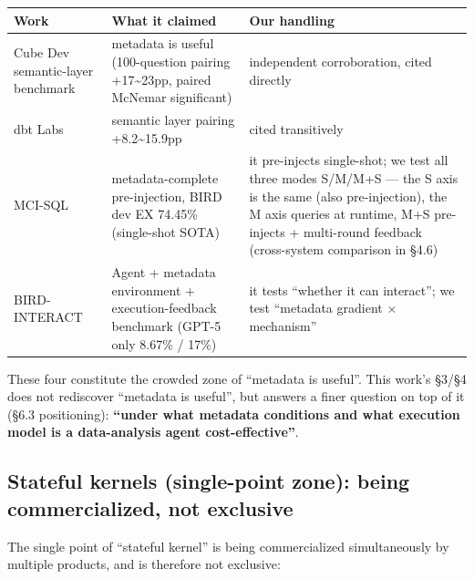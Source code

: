 \documentclass[11pt]{article}
\begin{document}
{\small
\begin{tabular}{@{}
  >{\raggedright\arraybackslash}p{}
  >{\raggedright\arraybackslash}p{}
  >{\raggedright\arraybackslash}p{}@{}}
\toprule
Work & What it claimed & Our handling \\
\midrule
Cube Dev semantic-layer benchmark \cite{cube-semantic} & metadata is useful (100-question pairing +17\textasciitilde23pp, paired McNemar significant) & independent corroboration, cited directly \\
dbt Labs \cite{dbt-semantic} & semantic layer pairing +8.2\textasciitilde15.9pp & cited transitively \\
MCI-SQL \cite{mcisql} & metadata-complete pre-injection, BIRD dev EX 74.45\% (single-shot SOTA) & it pre-injects single-shot; we test all three modes S/M/M+S --- the S axis is the same (also pre-injection), the M axis queries at runtime, M+S pre-injects + multi-round feedback (cross-system comparison in \S{}4.6) \\
BIRD-INTERACT \cite{bird-interact} & Agent + metadata environment + execution-feedback benchmark (GPT-5~\cite{gpt-5} only 8.67\% / 17\%) & it tests ``whether it can interact''; we test ``metadata gradient $\times$ mechanism'' \\
\bottomrule
\end{tabular}}

These four constitute the crowded zone of ``metadata is useful''. This work's \S{}3/\S{}4 does not rediscover ``metadata is useful'', but answers a finer question on top of it (\S{}6.3 positioning): \textbf{``under what metadata conditions and what execution model is a data-analysis agent cost-effective''}.

\subsection{Stateful kernels (single-point zone): being commercialized, not exclusive}

The single point of ``stateful kernel'' is being commercialized simultaneously by multiple products, and is therefore not exclusive:
\end{document}
